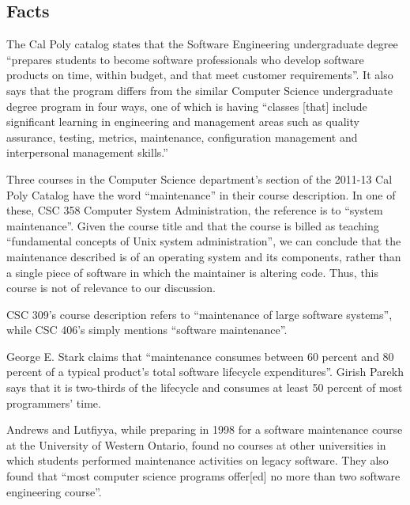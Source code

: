 \documentclass[11pt]{article}
\begin{document}
\begin{multicols}{2}
\setcounter{page}{1}
\section{Facts}

The Cal Poly catalog states that the Software Engineering undergraduate degree ``prepares students to become software professionals who develop software 
products on time, within budget, and that meet customer requirements''. \cite{catalogDept}  It also says that the program differs from the similar Computer Science undergraduate degree program in four ways, one of which is having ``classes [that] include significant learning in engineering and management areas such as quality assurance, testing, metrics, maintenance, configuration management and interpersonal management skills.'' \cite{catalogDept}

Three courses in the Computer Science department's section of the 2011-13 Cal Poly Catalog have the word ``maintenance'' in their course description. \cite{catalogCourses}  In one of these, CSC 358 Computer System Administration, the reference is to ``system maintenance''. \cite{catalogCourses}  Given the course title and that the course is billed as teaching ``fundamental concepts of Unix system administration'', \cite{catalogCourses} we can conclude that the maintenance described is of an operating system and its components, rather than a single piece of software in which the maintainer is altering code.  Thus, this course is not of relevance to our discussion.

CSC 309's course description refers to ``maintenance of large software systems'', while CSC 406's simply mentions ``software maintenance''. \cite{catalogCourses}

George E. Stark claims that ``maintenance consumes between 60 percent and 80 percent of a typical product's total software lifecycle expenditures''. \cite{stark97}  Girish Parekh says that it is two-thirds of the lifecycle and consumes at least 50 percent of most programmers' time. \cite{parekh}

Andrews and Lutfiyya, while preparing in 1998 for a software maintenance course at the University of Western Ontario, found no courses at other universities in which students performed maintenance activities on legacy software. \cite{Andrews:2000:ERS:794188.794320} They also found that ``most computer science programs offer[ed] no more than two software engineering course''. \cite{Andrews:2000:ERS:794188.794320}


\end{multicols}
\end{document}
